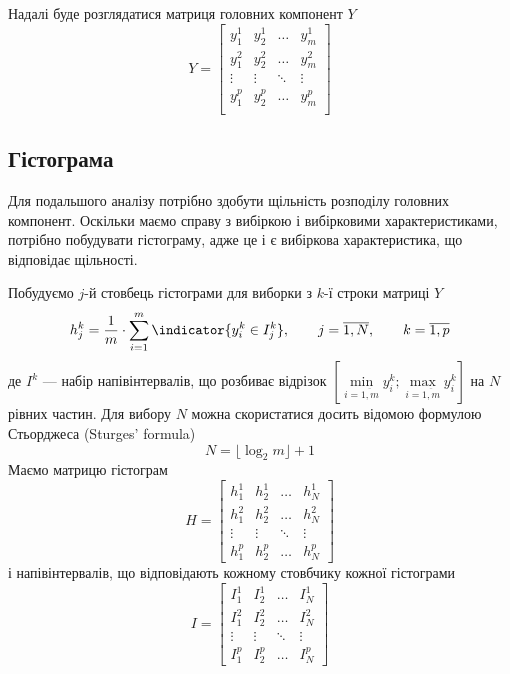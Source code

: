 Надалі буде розглядатися матриця головних компонент $Y$
\begin{equation*}
  Y = \begin{bmatrix}
    y_1^1  & y_2^1  & \dots  & y_m^1  \\
    y_1^2  & y_2^2  & \dots  & y_m^2  \\
    \vdots & \vdots & \ddots & \vdots \\
    y_1^p  & y_2^p  & \dots  & y_m^p  \\
    \end{bmatrix}
\end{equation*}
\subsection{Гістограма}

Для подальшого аналізу потрібно здобути щільність розподілу головних компонент.
Оскільки маємо справу з вибіркою і вибірковими характеристиками,
потрібно побудувати гістограму, адже це і є вибіркова характеристика,
що відповідає щільності.

Побудуємо $j$-й стовбець гістограми для виборки з $k$-ї строки матриці $Y$
\begin{equation*}
  h_j^k = \frac{1}{m} \cdot \sum_{i=1}^{m} \indicator{y_i^k \in I_j^k},
  \qquad j = \overline{1, N},
  \qquad k = \overline{1, p}
\end{equation*}
де $I^k$ --- набір напівінтервалів, що розбиває відрізок
$\left[ \min\limits_{i=\overline{1,m}}{y_i^k};
\max\limits_{i=\overline{1,m}}{y_i^k} \right]$ на $N$ рівних частин.
Для вибору $N$ можна скористатися досить відомою формулою Стьорджеса
(Sturges' formula) \cite{Sturges:1926:CCI}
\begin{equation*}
  N = \lfloor \log_2 m \rfloor + 1
\end{equation*}
Маємо матрицю гістограм
\begin{equation*}
  H = \begin{bmatrix}
    h_1^1  & h_2^1  & \dots  & h_N^1  \\
    h_1^2  & h_2^2  & \dots  & h_N^2  \\
    \vdots & \vdots & \ddots & \vdots \\
    h_1^p  & h_2^p  & \dots  & h_N^p
  \end{bmatrix}
\end{equation*}
і напівінтервалів, що відповідають кожному стовбчику кожної гістограми
\begin{equation*}
  I = \begin{bmatrix}
    I_1^1  & I_2^1  & \dots  & I_N^1  \\
    I_1^2  & I_2^2  & \dots  & I_N^2  \\
    \vdots & \vdots & \ddots & \vdots \\
    I_1^p  & I_2^p  & \dots  & I_N^p
  \end{bmatrix}
\end{equation*}

